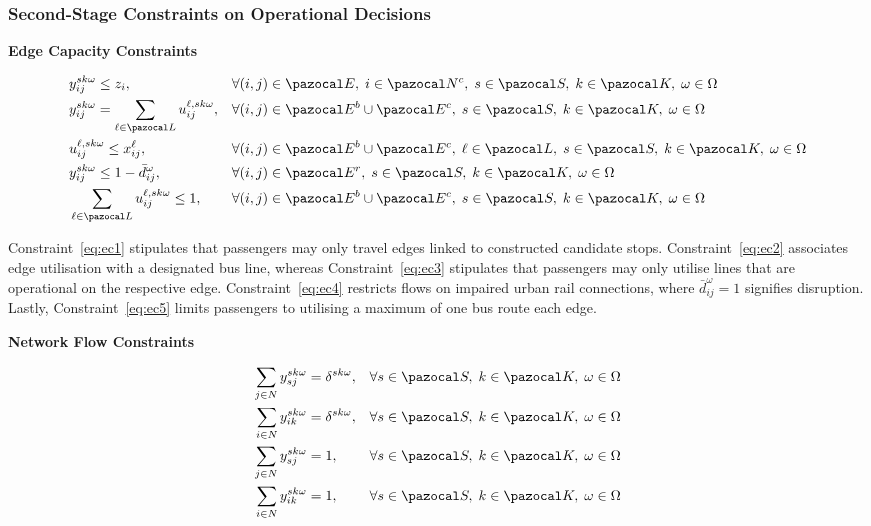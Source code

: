 \documentclass[3p,times,procedia]{elsarticle}
\begin{document}
\subsubsection{Second-Stage Constraints on Operational Decisions}

\textbf{Edge Capacity Constraints}

\begin{align}
& y_{ij}^{sk\omega} \leq z_i, 
&& \forall (i,j) \in \pazocal E,\; i \in \pazocal N^c,\; s \in \pazocal S,\; k \in \pazocal K,\; \omega \in \Omega
\label{eq:ec1} \\
& y_{ij}^{sk\omega} = \sum_{\ell \in \pazocal L} u_{ij}^{\ell,sk\omega}, 
&& \forall (i,j) \in \pazocal E^b \cup \pazocal E^c,\; s \in \pazocal S,\; k \in \pazocal K,\; \omega \in \Omega
\label{eq:ec2} \\
& u_{ij}^{\ell,sk\omega} \leq x_{ij}^\ell, 
&& \forall (i,j) \in \pazocal E^b \cup \pazocal E^c,\; \ell \in \pazocal L,\; s \in \pazocal S,\; k \in \pazocal K,\; \omega \in \Omega
\label{eq:ec3} \\
& y_{ij}^{sk\omega} \leq 1 - \bar{d}_{ij}^\omega, 
&& \forall (i,j) \in \pazocal E^r,\; s \in \pazocal S,\; k \in \pazocal K,\; \omega \in \Omega
\label{eq:ec4} \\
& \sum_{\ell \in \pazocal L} u_{ij}^{\ell,sk\omega} \leq 1, 
&& \forall (i,j) \in \pazocal E^b \cup \pazocal E^c,\; s \in \pazocal S,\; k \in \pazocal K,\; \omega \in \Omega
\label{eq:ec5}
\end{align}

Constraint~\eqref{eq:ec1} stipulates that passengers may only travel edges linked to constructed candidate stops. 
Constraint~\eqref{eq:ec2} associates edge utilisation with a designated bus line, whereas Constraint~\eqref{eq:ec3} stipulates that passengers may only utilise lines that are operational on the respective edge. 
Constraint~\eqref{eq:ec4} restricts flows on impaired urban rail connections, where $\bar{d}_{ij}^\omega=1$ signifies disruption. 
Lastly, Constraint~\eqref{eq:ec5} limits passengers to utilising a maximum of one bus route each edge.

\textbf{Network Flow Constraints}

\begin{align}
\sum_{j \in N} y_{sj}^{sk\omega} &= \delta^{sk\omega},
&& \forall s \in \pazocal S,\; k \in \pazocal K,\; \omega \in \Omega
\label{eq:fc1a} \\
\sum_{i \in N} y_{ik}^{sk\omega} &= \delta^{sk\omega},
&& \forall s \in \pazocal S,\; k \in \pazocal K,\; \omega \in \Omega
\label{eq:fc1b} \\
\sum_{j \in N} y_{sj}^{sk\omega} &= 1,
&& \forall s \in \pazocal S,\; k \in \pazocal K,\; \omega \in \Omega
\label{eq:fc2a} \\
\sum_{i \in N} y_{ik}^{sk\omega} &= 1,
&& \forall s \in \pazocal S,\; k \in \pazocal K,\; \omega \in \Omega
\label{eq:fc2b}
\end{align}
\end{document}
